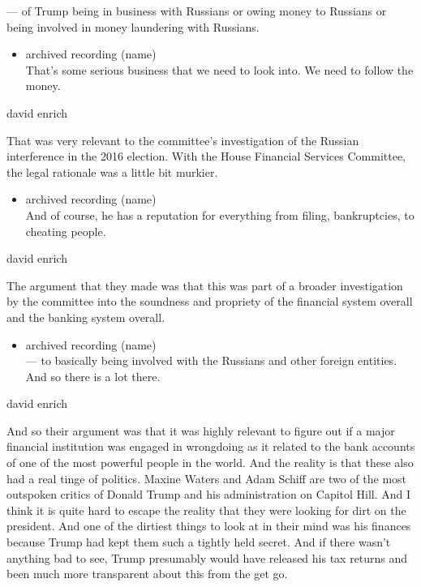 --- of Trump being in business with Russians or owing money to Russians
or being involved in money laundering with Russians.

\begin{itemize}
\tightlist
\item
  archived recording (name)\\
  That's some serious business that we need to look into. We need to
  follow the money.
\end{itemize}

david enrich

That was very relevant to the committee's investigation of the Russian
interference in the 2016 election. With the House Financial Services
Committee, the legal rationale was a little bit murkier.

\begin{itemize}
\tightlist
\item
  archived recording (name)\\
  And of course, he has a reputation for everything from filing,
  bankruptcies, to cheating people.
\end{itemize}

david enrich

The argument that they made was that this was part of a broader
investigation by the committee into the soundness and propriety of the
financial system overall and the banking system overall.

\begin{itemize}
\tightlist
\item
  archived recording (name)\\
  --- to basically being involved with the Russians and other foreign
  entities. And so there is a lot there.
\end{itemize}

david enrich

And so their argument was that it was highly relevant to figure out if a
major financial institution was engaged in wrongdoing as it related to
the bank accounts of one of the most powerful people in the world. And
the reality is that these also had a real tinge of politics. Maxine
Waters and Adam Schiff are two of the most outspoken critics of Donald
Trump and his administration on Capitol Hill. And I think it is quite
hard to escape the reality that they were looking for dirt on the
president. And one of the dirtiest things to look at in their mind was
his finances because Trump had kept them such a tightly held secret. And
if there wasn't anything bad to see, Trump presumably would have
released his tax returns and been much more transparent about this from
the get go.

